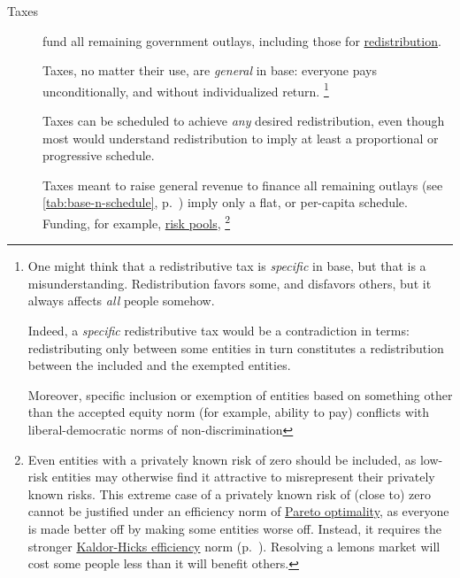 \begin{description}
	\item[Taxes]  \label{sec:taxes}
	fund all remaining government outlays, including those for \hyperref[sec:redistributive-policy]{redistribution}.

	Taxes, no matter their use, are \emph{general} in base:
	everyone pays unconditionally, and without individualized return.
	\footnote{
		One might think that a redistributive tax is \emph{specific} in base, but that is a misunderstanding.
		Redistribution favors some, and disfavors others, but it always affects \emph{all} people somehow.

		Indeed, a \emph{specific} redistributive tax would be a contradiction in terms:
		redistributing only between some entities in turn constitutes a redistribution between the included and the exempted entities.

		Moreover, specific inclusion or exemption of entities based on something other than the accepted equity norm (for example, ability to pay) conflicts with liberal-democratic norms of non-discrimination
	}

	Taxes can be scheduled to achieve \emph{any} desired redistribution, even though most would understand redistribution to imply at least a proportional or progressive schedule.



	Taxes meant to raise general revenue to finance all remaining outlays (see \autoref{tab:base-n-schedule}, p.~\pageref{tab:base-n-schedule}) imply only a flat, or per-capita schedule.
Funding, for example, \hyperref[sec:adverse-selection]{risk pools},
\footnote{
	Even entities with a privately known risk of zero should be included, as low-risk entities may otherwise find it attractive to misrepresent their privately known risks.
	This extreme case of a privately known risk of (close to) zero cannot be justified under an efficiency norm of \hyperref[sec:Pareto]{Pareto optimality}, as everyone is made better off by making some entities worse off.
	Instead, it requires the stronger \hyperref[sec:KaldorHicks]{Kaldor-Hicks efficiency} norm (p.~\pageref{sec:Efficiency})\citep{Kaldor1939,Hicks1939}.
	Resolving a lemons market will cost some people less than it will benefit others.
}


\end{description}
